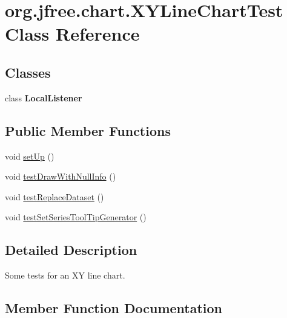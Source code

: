 \hypertarget{classorg_1_1jfree_1_1chart_1_1_x_y_line_chart_test}{}\section{org.\+jfree.\+chart.\+X\+Y\+Line\+Chart\+Test Class Reference}
\label{classorg_1_1jfree_1_1chart_1_1_x_y_line_chart_test}
\subsection*{Classes}
\begin{DoxyCompactItemize}
\item 
class {\bfseries Local\+Listener}
\end{DoxyCompactItemize}
\subsection*{Public Member Functions}
\begin{DoxyCompactItemize}
\item 
void \mbox{\hyperlink{classorg_1_1jfree_1_1chart_1_1_x_y_line_chart_test_a8e3e5e2b8b7d8810a93f295c9355c7a7}{set\+Up}} ()
\item 
void \mbox{\hyperlink{classorg_1_1jfree_1_1chart_1_1_x_y_line_chart_test_a64a9ca432307d5d11de5c859a77665d3}{test\+Draw\+With\+Null\+Info}} ()
\item 
void \mbox{\hyperlink{classorg_1_1jfree_1_1chart_1_1_x_y_line_chart_test_a315233a56080894a19eac7fea4e84b6e}{test\+Replace\+Dataset}} ()
\item 
void \mbox{\hyperlink{classorg_1_1jfree_1_1chart_1_1_x_y_line_chart_test_ab8c9f1f3e611b7e4621b25c8281f0cfd}{test\+Set\+Series\+Tool\+Tip\+Generator}} ()
\end{DoxyCompactItemize}


\subsection{Detailed Description}
Some tests for an XY line chart. 

\subsection{Member Function Documentation}
\mbox{\label{classorg_1_1jfree_1_1chart_1_1_x_y_line_chart_test_a8e3e5e2b8b7d8810a93f295c9355c7a7}} 
